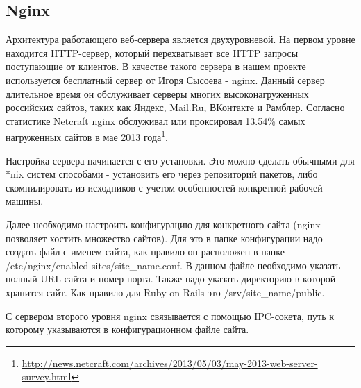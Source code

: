 \subsection{Nginx}
Архитектура работающего веб-сервера является двухуровневой. На первом уровне
находится HTTP-сервер, который перехватывает все HTTP запросы поступающие от
клиентов. В качестве такого сервера в нашем проекте используется бесплатный
сервер от Игоря Сысоева - nginx. Данный сервер длительное время он обслуживает
серверы многих высоконагруженных российских сайтов, таких как Яндекс, Mail.Ru,
ВКонтакте и Рамблер. Согласно статистике Netcraft nginx обслуживал или
проксировал 13.54\% самых нагруженных сайтов в мае 2013 года\footnote{
	\url{http://news.netcraft.com/archives/2013/05/03/may-2013-web-server-survey.html}
}.

Настройка сервера начинается с его установки. Это можно сделать обычными для
*nix систем способами - установить его через репозиторий пакетов, либо
скомпилировать из исходников с учетом особенностей конкретной рабочей машины.

Далее необходимо настроить конфигурацию для конкретного сайта (nginx позволяет
хостить множество сайтов). Для это в папке конфигурации надо создать файл с
именем сайта, как правило он расположен в папке
/etc/nginx/enabled-sites/site\_name.conf. В данном файле необходимо указать
полный URL сайта и номер порта. Также надо указать директорию в которой хранится
сайт. Как правило  для Ruby on Rails это /srv/site\_name/public.

С сервером второго уровня nginx связывается с помощью IPC-сокета, путь к 
которому указываются в конфигурационном файле сайта.